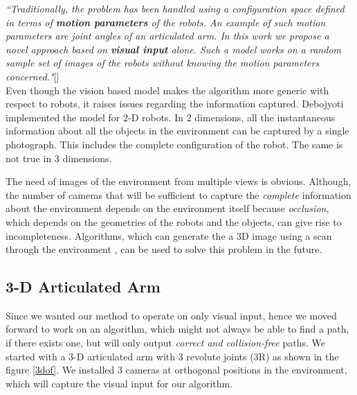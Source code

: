 \documentclass[12pt, two column]{article}
\begin{document}
\textit{``Traditionally, the problem has been handled using a configuration space defined in terms of \textbf{motion parameters} of the robots. An example of such motion parameters are joint angles of an articulated arm. In this work we propose a novel approach based on \textbf{visual input} alone. Such a model works on a random sample set of images of the robots without knowing the motion parameters concerned."}[\cite{deb}]\\
Even though the vision based model makes the algorithm more generic with respect to robots, it raises issues regarding the information captured. Debojyoti implemented the model for 2-D robots. In 2 dimensions, all the instantaneous information about all the objects in the environment can be captured by a single photograph. This includes the complete configuration of the robot. The same is not true in 3 dimensions.

The need of images of the environment from multiple views is obvious. Although, the number of cameras that will be sufficient to capture the \textit{complete} information about the environment depends on the environment itself because \textit{occlusion}, which depends on the geometries of the robots and the objects, can give rise to incompleteness. Algorithms, which can generate the a 3D image using a scan through the environment \cite{bica}, can be used to solve this problem in the future.

\subsection{3-D Articulated Arm}

Since we wanted our method to operate on only visual input, hence we moved forward to work on an algorithm, which might not always be able to find a path, if there exists one, but will only output \textit{correct and collision-free} paths. We started with a 3-D articulated arm with 3 revolute joints (3R) as shown in the figure \ref{3dof}. We installed 3 cameras at orthogonal positions in the environment, which will capture the visual input for our algorithm.
\end{document}
